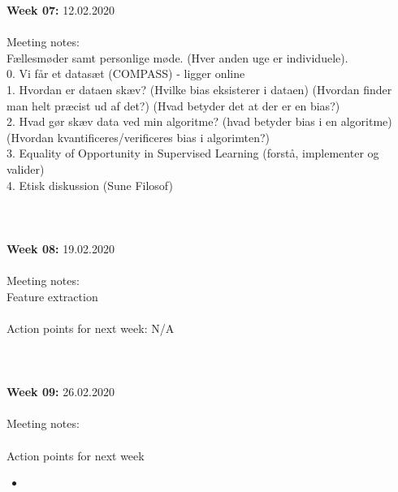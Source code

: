 \documentclass[11pt, fleqn]{article}
\begin{document}
	\textbf{Week 07:}  12.02.2020 \\\\
	\noindent
	Meeting notes: \\ Fællesmøder samt personlige møde. (Hver anden uge er individuele). \\0. Vi får et datasæt (COMPASS) - ligger online \\
	1. Hvordan er dataen skæv? (Hvilke bias eksisterer i dataen) (Hvordan finder man helt præcist ud af det?) (Hvad betyder det at der er en bias?) \\
	2. Hvad gør skæv data ved min algoritme? (hvad betyder bias i en algoritme) (Hvordan kvantificeres/verificeres bias i algorimten?) \\
	3. Equality of Opportunity in Supervised Learning (forstå, implementer og valider) \\ 
	4. Etisk diskussion (Sune Filosof)
	\\\\\\\\
	\textbf{Week 08:}  19.02.2020 \\\\
	\noindent
	Meeting notes: \\ Feature extraction
	\\\\
	Action points for next week: N/A
	\\\\\\\\
	\textbf{Week 09:}  26.02.2020 \\\\
	\noindent
	Meeting notes: 
	\\\\
	Action points for next week
	\begin{itemize}
		\item  
	\end{itemize} 
		
	
\end{document}
